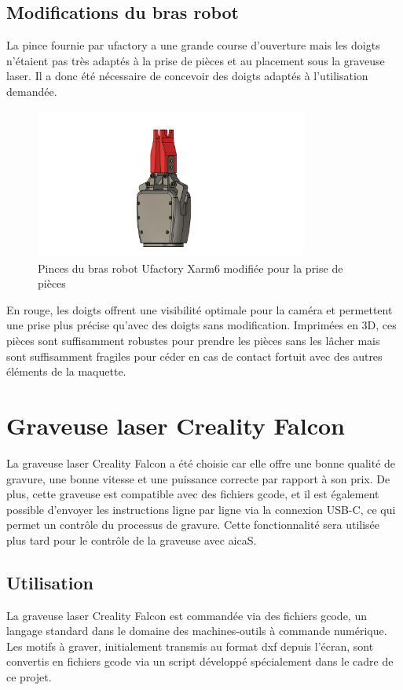 \subsection{Modifications du bras robot}
La pince fournie par \gls{ufactory} a une grande course d'ouverture mais les doigts n'étaient pas très adaptés à la prise de pièces et au placement sous la graveuse laser. Il a donc été nécessaire de concevoir des doigts adaptés à l'utilisation demandée.
\begin{figure}[H]
    \centering
    \includegraphics[width=0.8\textwidth]{assets/figures/Pince_Xarm6.png}
    \caption{Pinces du bras robot Ufactory Xarm6 modifiée pour la prise de pièces}
    \label{fig:pince_robot}
\end{figure}

En rouge, les doigts offrent une visibilité optimale pour la caméra et permettent une prise plus précise qu'avec des doigts sans modification. Imprimées en 3D, ces pièces sont suffisamment robustes pour prendre les pièces sans les lâcher mais sont suffisamment fragiles pour céder en cas de contact fortuit avec des autres éléments de la maquette.

\section{Graveuse laser Creality Falcon}

La graveuse laser Creality Falcon a été choisie car elle offre une bonne qualité de gravure, une bonne vitesse et une puissance correcte par rapport à son prix. De plus, cette graveuse est compatible avec des fichiers \gls{gcode}, et il est également possible d'envoyer les instructions ligne par ligne via la connexion USB-C, ce qui permet un contrôle du processus de gravure. Cette fonctionnalité sera utilisée plus tard pour le contrôle de la graveuse avec \gls{aicaS}.

\subsection{Utilisation}
La graveuse laser Creality Falcon est commandée via des fichiers \gls{gcode}, un langage standard dans le domaine des machines-outils à commande numérique. Les motifs à graver, initialement transmis au format \gls{dxf} depuis l'écran, sont convertis en fichiers \gls{gcode} via un script développé spécialement dans le cadre de ce projet.

